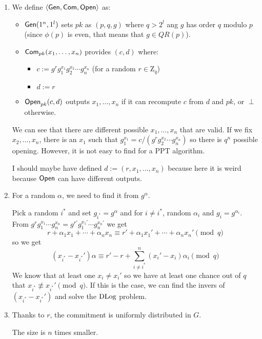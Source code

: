\begin{solution}
  \begin{enumerate}
    \item
      We define $\langle \operatorname{\mathsf{Gen}}, \operatorname{\mathsf{Com}}, \operatorname{\mathsf{Open}} \rangle$ as:
      \begin{itemize}
        \item $\operatorname{\mathsf{Gen}}(1^n, 1^l)$ sets $pk$ as $(p,q,g)$ where $q > 2^l$ ang $g$ has order $q$ modulo $p$ (since $\phi(p)$ is even, that means that $g \in QR(p)$).
        \item $\operatorname{\mathsf{Com}}_{pk}(x_1, \ldots, x_n)$ provides $(c,d)$ where:
          \begin{itemize}
            \item $c := g^r g_1^{x_1} g_2^{x_2} \cdots g_n^{x_n}$ (for a random $r \in \mathrm{Z}_q$)
            \item $d := r$
          \end{itemize}
        \item $\operatorname{\mathsf{Open}}_{pk}(c,d)$ outputs $x_1, \ldots, x_n$ if it can recompute $c$ from $d$ and $pk$,
          or $\perp$ otherwise.
      \end{itemize}
      We can see that there are different possible $x_1, \ldots, x_n$ that are valid.
      If we fix $x_2, \ldots, x_n$,
      there is an $x_1$ such that $g_1^{x_1} = c / (g^r g_2^{x_2} \cdots g_n^{x_n})$
      so there is $q^n$ possible opening.
      However, it is not easy to find for a PPT algorithm.

      I should maybe have defined $d := (r, x_1, \ldots, x_n)$ because here it is weird because $\operatorname{\mathsf{Open}}$ can have different outputs.
    \item
      For a random $\alpha$, we need to find it from $g^\alpha$.

      Pick a random $i^*$ and set $g_{i^*} = g^\alpha$ and for $i \neq i^*$, random $\alpha_i$ and $g_i = g^{\alpha_i}$.
      From $g^rg_1^{x_1} \cdots g_n^{x_n} = g^{r'}g_1^{x_1'} \cdots g_n^{x_n'}$ we get
      \[ r + \alpha_1 x_1 + \cdots + \alpha_n x_n \equiv r' + \alpha_1 x_1' + \cdots + \alpha_n x_n' \pmod{q} \]
      so we get
      \[ (x_{i^*} - x_{i^*}') \alpha \equiv r' - r + \sum_{i \neq i^*}^n (x_i' - x_i) \alpha_i \pmod{q} \]
      We know that at least one $x_i \neq x_i'$ so we have at least one chance out of $q$ that $x_{i^*} \not\equiv x_{i^*}' \pmod{q}$.
      If this is the case, we can find the invers of $(x_{i^*} - x_{i^*}')$ and solve the $\operatorname{DLog}$ problem.
    \item
      Thanks to $r$, the commitment is uniformly distributed in $G$.

      The size is $n$ times smaller.
  \end{enumerate}
\end{solution}

